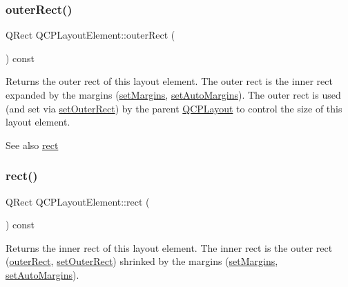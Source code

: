 \mbox{\label{classQCPLayoutElement_a2a32a12a6161c9dffbadeb9cc585510c}} 
\subsubsection{\texorpdfstring{outer\+Rect()}{outerRect()}}
{\footnotesize\ttfamily Q\+Rect Q\+C\+P\+Layout\+Element\+::outer\+Rect (\begin{DoxyParamCaption}{ }\end{DoxyParamCaption}) const\hspace{0.3cm}{\ttfamily [inline]}}

Returns the outer rect of this layout element. The outer rect is the inner rect expanded by the margins (\hyperlink{classQCPLayoutElement_a8f450b1f3f992ad576fce2c63d8b79cf}{set\+Margins}, \hyperlink{classQCPLayoutElement_accfda49994e3e6d51ed14504abf9d27d}{set\+Auto\+Margins}). The outer rect is used (and set via \hyperlink{classQCPLayoutElement_a38975ea13e36de8e53391ce41d94bc0f}{set\+Outer\+Rect}) by the parent \hyperlink{classQCPLayout}{Q\+C\+P\+Layout} to control the size of this layout element.

\begin{DoxySeeAlso}{See also}
\hyperlink{classQCPLayoutElement_a208effccfe2cca4a0eaf9393e60f2dd4}{rect} 
\end{DoxySeeAlso}
\mbox{\label{classQCPLayoutElement_a208effccfe2cca4a0eaf9393e60f2dd4}} 
\subsubsection{\texorpdfstring{rect()}{rect()}}
{\footnotesize\ttfamily Q\+Rect Q\+C\+P\+Layout\+Element\+::rect (\begin{DoxyParamCaption}{ }\end{DoxyParamCaption}) const\hspace{0.3cm}{\ttfamily [inline]}}

Returns the inner rect of this layout element. The inner rect is the outer rect (\hyperlink{classQCPLayoutElement_a2a32a12a6161c9dffbadeb9cc585510c}{outer\+Rect}, \hyperlink{classQCPLayoutElement_a38975ea13e36de8e53391ce41d94bc0f}{set\+Outer\+Rect}) shrinked by the margins (\hyperlink{classQCPLayoutElement_a8f450b1f3f992ad576fce2c63d8b79cf}{set\+Margins}, \hyperlink{classQCPLayoutElement_accfda49994e3e6d51ed14504abf9d27d}{set\+Auto\+Margins}).

